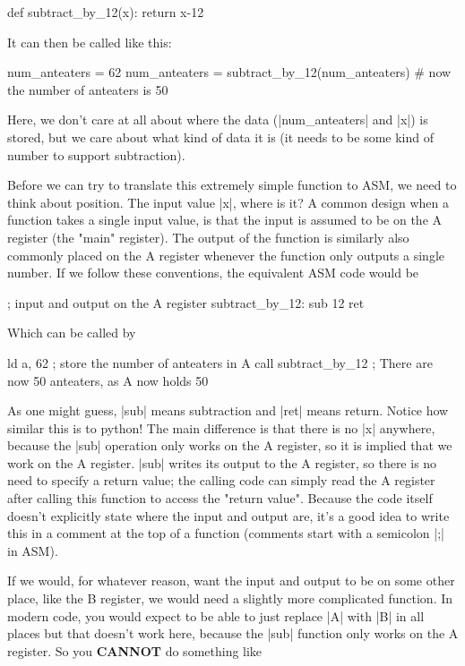 \documentclass[11pt]{book}
\begin{document}
\begin{code}
def subtract_by_12(x):
    return x-12
\end{code}

It can then be called like this:

\begin{code}
num_anteaters = 62
num_anteaters = subtract_by_12(num_anteaters)
# now the number of anteaters is 50
\end{code}

Here, we don't care at all about where the data (|num_anteaters| and |x|) is stored, but we care about what kind of data it is (it needs to be some kind of number to support subtraction). 

Before we can try to translate this extremely simple function to ASM, we need to think about position. The input value |x|, where is it? A common design when a function takes a single input value, is that the input is assumed to be on the A register (the "main" register). The output of the function is similarly also commonly placed on the A register whenever the function only outputs a single number. If we follow these conventions, the equivalent ASM code would be 

\begin{code}
; input and output on the A register
subtract_by_12:
    sub 12
    ret
\end{code}

Which can be called by

\begin{code}
ld a, 62 ; store the number of anteaters in A 
call subtract_by_12
; There are now 50 anteaters, as A now holds 50
\end{code}

As one might guess, |sub| means subtraction and |ret| means return. Notice how similar this is to python! The main difference is that there is no |x| anywhere, because the |sub| operation only works on the A register, so it is implied that we work on the A register. |sub| writes its output to the A register, so there is no need to specify a return value; the calling code can simply read the A register after calling this function to access the "return value". Because the code itself doesn't explicitly state where the input and output are, it's a good idea to write this in a comment at the top of a function (comments start with a semicolon |;| in ASM).

If we would, for whatever reason, want the input and output to be on some other place, like the B register, we would need a slightly more complicated function. In modern code, you would expect to be able to just replace |A| with |B| in all places but that doesn't work here, because the |sub| function only works on the A register. So you \textbf{CANNOT} do something like 
\end{document}
